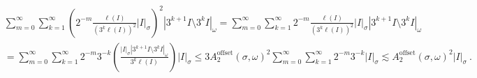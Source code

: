 \documentclass{amsart}%
\theoremstyle{plain}
\numberwithin{equation}{section}
\begin{document}
\begin{align*}
& \sum_{m=0}^{\infty}\sum_{k=1}^{\infty}\left(  2^{-m}\frac{\ell\left(
I\right)  }{\left(  3^{k}\ell\left(  I\right)  \right)  ^{2}}\left\vert
I\right\vert _{\sigma}\right)  ^{2}\left\vert 3^{k+1}I\setminus3^{k}%
I\right\vert _{\omega}=\sum_{m=0}^{\infty}\sum_{k=1}^{\infty}2^{-m}\frac
{\ell\left(  I\right)  }{\left(  3^{k}\ell\left(  I\right)  \right)  ^{2}%
}\left\vert I\right\vert _{\sigma}\left\vert 3^{k+1}I\setminus3^{k}%
I\right\vert _{\omega}\\
& =\sum_{m=0}^{\infty}\sum_{k=1}^{\infty}2^{-m}3^{-k}\left(  \frac{\left\vert
I\right\vert _{\sigma}\left\vert 3^{k+1}I\setminus3^{k}I\right\vert _{\omega}%
}{3^{k}\ell\left(  I\right)  }\right)  \left\vert I\right\vert _{\sigma}%
\leq3A_{2}^{\operatorname*{offset}}\left(  \sigma,\omega\right)  ^{2}%
\sum_{m=0}^{\infty}\sum_{k=1}^{\infty}2^{-m}3^{-k}\left\vert I\right\vert
_{\sigma}\lesssim A_{2}^{\operatorname*{offset}}\left(  \sigma,\omega\right)
^{2}\left\vert I\right\vert _{\sigma}\ .
\end{align*}
\end{document}
